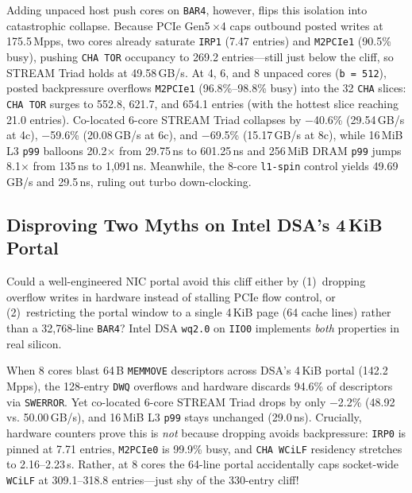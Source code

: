 Adding unpaced host push cores on \texttt{BAR4}, however, flips this isolation into catastrophic collapse. Because PCIe Gen5\,$\times$4 caps outbound posted writes at 175.5\,Mpps, two cores already saturate \texttt{IRP1} (7.47 entries) and \texttt{M2PCIe1} (90.5\% busy), pushing \texttt{CHA TOR} occupancy to 269.2 entries---still just below the cliff, so STREAM Triad holds at 49.58\,GB/s. At 4, 6, and 8 unpaced cores (\texttt{b\,=\,512}), posted backpressure overflows \texttt{M2PCIe1} (96.8\%--98.8\% busy) into the 32 \texttt{CHA} slices: \texttt{CHA TOR} surges to 552.8, 621.7, and 654.1 entries (with the hottest slice reaching 21.0 entries). Co-located 6-core STREAM Triad collapses by $-$40.6\% (29.54\,GB/s at 4c), $-$59.6\% (20.08\,GB/s at 6c), and $-$69.5\% (15.17\,GB/s at 8c), while 16\,MiB L3 \texttt{p99} balloons 20.2$\times$ from 29.75\,ns to 601.25\,ns and 256\,MiB DRAM \texttt{p99} jumps 8.1$\times$ from 135\,ns to 1,091\,ns. Meanwhile, the 8-core \texttt{l1-spin} control yields 49.69\,GB/s and 29.5\,ns, ruling out turbo down-clocking.

\subsection{Disproving Two Myths on Intel DSA's \texorpdfstring{4\,KiB}{4 KiB} Portal}
\label{sec:host_dsa}

Could a well-engineered NIC portal avoid this cliff either by (1)~dropping overflow writes in hardware instead of stalling PCIe flow control, or (2)~restricting the portal window to a single 4\,KiB page (64 cache lines) rather than a 32,768-line \texttt{BAR4}? Intel DSA \texttt{wq2.0} on \texttt{IIO0} implements \emph{both} properties in real silicon.

When 8 cores blast 64\,B \texttt{MEMMOVE} descriptors across DSA's 4\,KiB portal (142.2\,Mpps), the 128-entry \texttt{DWQ} overflows and hardware discards 94.6\% of descriptors via \texttt{SWERROR}. Yet co-located 6-core STREAM Triad drops by only $-$2.2\% (48.92 vs. 50.00\,GB/s), and 16\,MiB L3 \texttt{p99} stays unchanged (29.0\,ns). Crucially, hardware counters prove this is \emph{not} because dropping avoids backpressure: \texttt{IRP0} is pinned at 7.71 entries, \texttt{M2PCIe0} is 99.9\% busy, and \texttt{CHA WCiLF} residency stretches to 2.16--2.23\,\textmu s. Rather, at 8 cores the 64-line portal accidentally caps socket-wide \texttt{WCiLF} at 309.1--318.8 entries---just shy of the 330-entry cliff!

